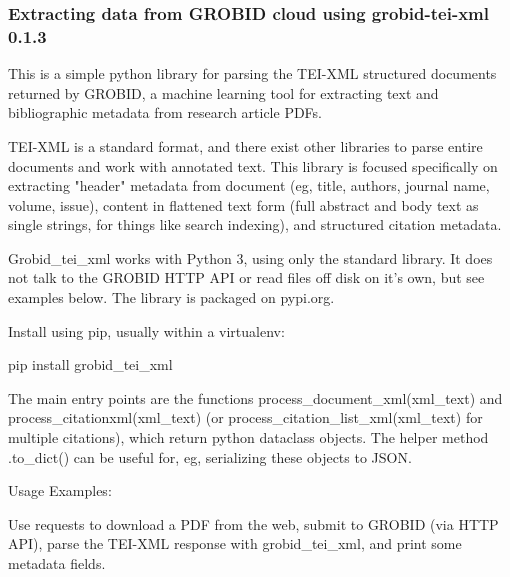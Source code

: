 \documentclass[
10pt, %
a4paper, %
oneside, %
headinclude,footinclude, %
BCOR5mm, %
]{scrartcl}
\begin{document}
\subsubsection{Extracting data from GROBID cloud using grobid-tei-xml 0.1.3}

This is a simple python library for parsing the TEI-XML structured documents returned by GROBID,
a machine learning tool for extracting text and bibliographic metadata from research article PDFs.

TEI-XML is a standard format, and there exist other libraries to parse entire documents and work with annotated text.
This library is focused specifically on extracting "header" metadata from document (eg, title, authors, journal name, volume, issue),
content in flattened text form (full abstract and body text as single strings,
for things like search indexing), and structured citation metadata.

Grobid{\_}tei{\_}xml works with Python 3, using only the standard library.
It does not talk to the GROBID HTTP API or read files off disk on it's own, but see examples below.
The library is packaged on pypi.org.

Install using pip, usually within a virtualenv:

pip install grobid{\_}tei{\_}xml

The main entry points are the functions process{\_}document{\_}xml(xml{\_}text) and process{\_}citationxml(xml{\_}text)
(or process{\_}citation{\_}list{\_}xml(xml{\_}text) for multiple citations), which return python dataclass objects.
The helper method .to{\_}dict() can be useful for, eg, serializing these objects to JSON.

Usage Examples:

Use requests to download a PDF from the web, submit to GROBID (via HTTP API), parse the TEI-XML
response with grobid{\_}tei{\_}xml, and print some metadata fields.


\end{document}
